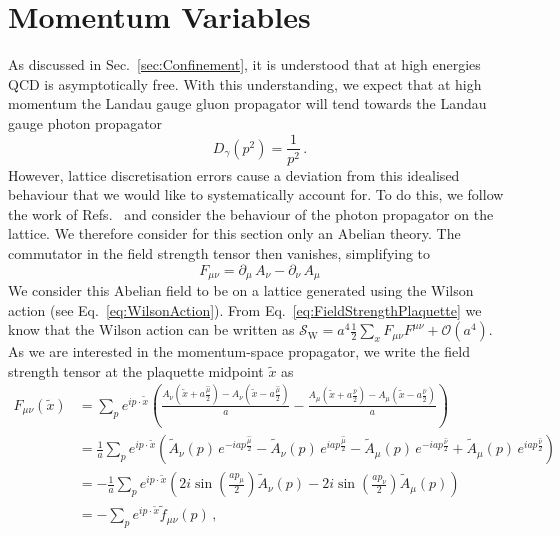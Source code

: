 \section{Momentum Variables}\label{sec:MomentumVariables}
As discussed in Sec.~\ref{sec:Confinement}, it is understood that at high energies QCD is asymptotically free. With this understanding, we expect that at high momentum the Landau gauge gluon propagator will tend towards the Landau gauge photon propagator~\cite{ryder1996quantum}
%
\begin{equation}
D_\gamma(p^2) = \frac{1}{p^2}\, .
\end{equation}
%
However, lattice discretisation errors cause a deviation from this idealised behaviour that we would like to systematically account for. To do this, we follow the work of Refs.~\cite{Weisz:1982zw, Weisz:1983bn,Luscher:1985zq,Symanzik:1983dc,Symanzik:1983gh} and consider the behaviour of the photon propagator on the lattice. We therefore consider for this section only an Abelian theory. The commutator in the field strength tensor then vanishes, simplifying to
%
\begin{equation}
F_{\mu\nu} = \partial_\mu \,A_\nu - \partial_\nu\,A_\mu
\end{equation}
%
We consider this Abelian field to be on a lattice generated using the Wilson action (see Eq.~\eqref{eq:WilsonAction}). From Eq.~\eqref{eq:FieldStrengthPlaquette} we know that the Wilson action can be written as $\mathcal{S}_\text{W} = a^4\frac{1}{2}\sum_x F_{\mu\nu}F^{\mu\nu} + \mathcal{O}(a^4)$. As we are interested in the momentum-space propagator, we write the field strength tensor at the plaquette midpoint $\tilde{x}$ as
%
\begin{align*}
F_{\mu\nu}(\tilde{x}) &= \sum_p e^{ip\cdot\tilde{x}} \left(\frac{A_\nu\left(\tilde{x}+a\frac{\hat{\mu}}{2}\right) - A_\nu\left(\tilde{x}-a\frac{\hat{\mu}}{2} \right)}{a} - \frac{A_\mu\left(\tilde{x}+a\frac{\hat{\nu}}{2}\right) - A_\mu\left(\tilde{x}-a\frac{\hat{\nu}}{2} \right)}{a}\right)\\
&= \frac{1}{a} \sum_p e^{ip\cdot\tilde{x}} \left(\tilde{A}_\nu(p)\, e^{-iap\frac{\hat{\mu}}{2}} - \tilde{A}_\nu(p)\, e^{iap\frac{\hat{\mu}}{2}} - \tilde{A}_\mu(p)\, e^{-iap\frac{\hat{\nu}}{2}} + \tilde{A}_\mu(p)\, e^{iap\frac{\hat{\nu}}{2}}\right)\\
&= -\frac{1}{a} \sum_p e^{ip\cdot\tilde{x}}\left(2i\sin\left(\frac{a p_\mu}{2}\right)\tilde{A}_\nu(p) - 2i\sin\left(\frac{a p_\nu}{2}\right)\tilde{A}_\mu(p)\right)\\
&= - \sum_p e^{ip\cdot\tilde{x}}\tilde{f}_{\mu\nu}(p)\, ,
\end{align*}
